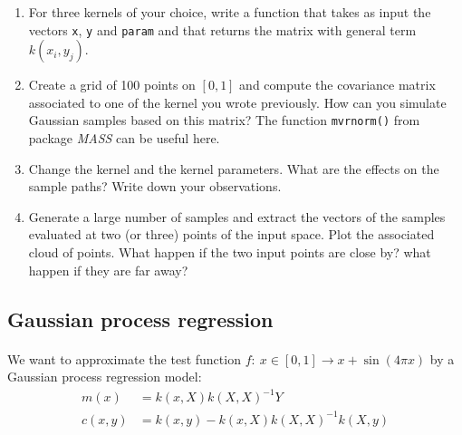 \documentclass[11pt]{scrartcl}
\begin{document}
\begin{enumerate}
	\item For three kernels of your choice, write a function that takes as input the vectors \texttt{x}, \texttt{y} and \texttt{param} and that returns the  matrix with general term $k(x_i,y_j)$.
	\item Create a grid of 100 points on $[0,1]$ and compute the covariance matrix associated to one of the kernel you wrote previously. How can you simulate Gaussian samples based on this matrix? The function \texttt{mvrnorm()} from package \emph{MASS} can be useful here. 
	\item Change the kernel and the kernel parameters. What are the effects on the sample paths? Write down your observations.
	\item Generate a large number of samples and extract the vectors of the samples evaluated at two (or three) points of the input space. Plot the associated cloud of points. What happen if the two input points are close by? what happen if they are far away?
\end{enumerate}

\subsection*{Gaussian process regression}
\paragraph{}
We want to approximate the test function $f:\ x \in [0,1] \rightarrow x + \sin(4 \pi x)$ by a Gaussian process regression model:
\begin{equation*}
\begin{split}
m(x)&=k(x,X) k(X,X)^{-1} Y\\
c(x,y)&=k(x,y) - k(x,X) k(X,X)^{-1}k(X,y)
\end{split}
\end{equation*}
\end{document}
